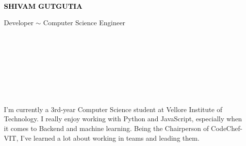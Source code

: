 \documentclass[9pt]{developercv}
\begin{document}

\begin{minipage}[t]{0.5\textwidth} 
	\vspace{-\baselineskip}
	
	{ \fontsize{16}{20} \textcolor{black}{\textbf{\MakeUppercase{Shivam Gutgutia}}}}
	
	\vspace{6pt}
	
	{\Large Developer $\sim$ Computer Science Engineer}
\end{minipage}
\hfill
\begin{minipage}[t]{0.2\textwidth}
	\vspace{-\baselineskip}
	\\ 
    \\
    \\
	
\end{minipage}
\begin{minipage}[t]{0.27\textwidth}
	\vspace{-\baselineskip}
	
	\\	
    \\
    \\    
    
\end{minipage}



\vspace{-6pt}

\hfill
I'm currently a 3rd-year Computer Science student at Vellore Institute of Technology. I really enjoy working with Python and JavaScript, especially when it comes to Backend and machine learning. Being the Chairperson of CodeChef-VIT, I've learned a lot about working in teams and leading them.\\
\end{document}
